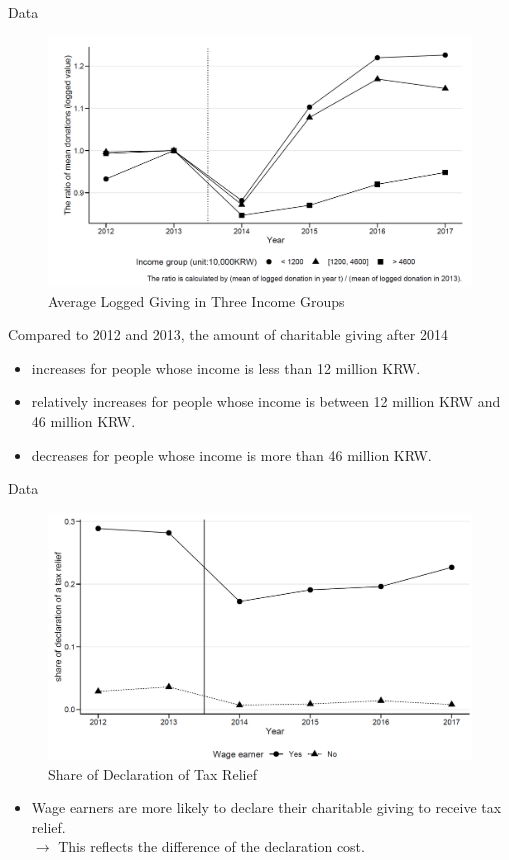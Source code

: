 \documentclass[dvipdfmx,10pt]{beamer}
\begin{document}
\begin{frame}{Data}
	\begin{figure}
		\centering
		\includegraphics[width=0.7\linewidth]{Fig_Diff}
		\caption{Average Logged Giving in Three Income Groups}
		\label{fig:3}
	\end{figure}
\small
	Compared to 2012 and 2013, the amount of charitable giving after 2014
	\begin{itemize}
		\item increases for people whose income is less than 12 million KRW.
		\item relatively increases for people whose income is between 12 million KRW and 46 million KRW.
		\item decreases for people whose income is more than 46 million KRW.
	\end{itemize}
\end{frame}

\begin{frame}{Data}
	\begin{figure}
		\centering
		\includegraphics[width=0.7\linewidth]{Fig_Declaration}
		\caption{Share of Declaration of Tax Relief}
		\label{fig:4}
	\end{figure}
\small
	\begin{itemize}
		\item Wage earners are more likely to declare their charitable giving to receive tax relief.\\
		$\to$ This reflects the difference of the declaration cost.
	\end{itemize}
\end{frame}
\end{document}
